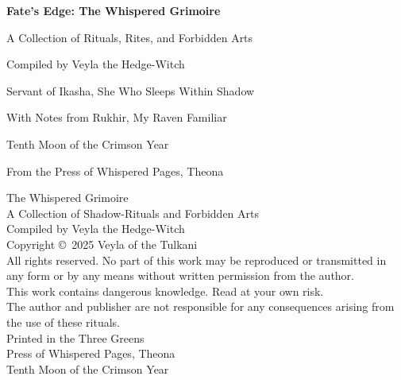\documentclass[12pt,twoside]{book}
\begin{document}
\frontmatter

\begin{titlepage}
\centering
\vspace*{2cm}
{\Huge\bfseries Fate's Edge: The Whispered Grimoire\par}
\vspace{1cm}
{\Large A Collection of Rituals, Rites, and Forbidden Arts\par}
\vspace{2cm}
{\Large Compiled by Veyla the Hedge-Witch\par}
\vspace{0.5cm}
{\large Servant of Ikasha, She Who Sleeps Within Shadow\par}
\vspace{1cm}
{\large With Notes from Rukhir, My Raven Familiar\par}
\vspace{3cm}
{\large Tenth Moon of the Crimson Year\par}
\vspace{0.5cm}
{\large From the Press of Whispered Pages, Theona\par}
\end{titlepage}

\newpage
\thispagestyle{empty}
\vspace*{5cm}
\begin{center}
{\small
The Whispered Grimoire\\
A Collection of Shadow-Rituals and Forbidden Arts\\
\vspace{0.5cm}
Compiled by Veyla the Hedge-Witch\\
\vspace{1cm}
Copyright \copyright\ 2025 Veyla of the Tulkani\\
All rights reserved. No part of this work may be reproduced or transmitted in any form or by any means without written permission from the author.\\
\vspace{1cm}
This work contains dangerous knowledge. Read at your own risk.\\
The author and publisher are not responsible for any consequences arising from the use of these rituals.\\
\vspace{1cm}
Printed in the Three Greens\\
Press of Whispered Pages, Theona\\
Tenth Moon of the Crimson Year
}
\end{center}
\end{document}
